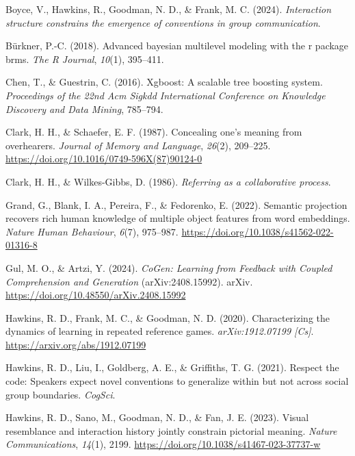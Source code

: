 \documentclass[10pt, letterpaper]{article}
\begin{document}
\label{refs}
\begin{CSLReferences}{1}{0}
Boyce, V., Hawkins, R., Goodman, N. D., \& Frank, M. C. (2024).
\emph{Interaction structure constrains the emergence of conventions in
group communication}.

Bürkner, P.-C. (2018). Advanced bayesian multilevel modeling with the r
package brms. \emph{The R Journal}, \emph{10}(1), 395--411.

Chen, T., \& Guestrin, C. (2016). Xgboost: {A} scalable tree boosting
system. \emph{Proceedings of the 22nd Acm Sigkdd International
Conference on Knowledge Discovery and Data Mining}, 785--794.

Clark, H. H., \& Schaefer, E. F. (1987). Concealing one's meaning from
overhearers. \emph{Journal of Memory and Language}, \emph{26}(2),
209--225. \url{https://doi.org/10.1016/0749-596X(87)90124-0}

Clark, H. H., \& Wilkes-Gibbs, D. (1986). \emph{Referring as a
collaborative process}.

Grand, G., Blank, I. A., Pereira, F., \& Fedorenko, E. (2022). Semantic
projection recovers rich human knowledge of multiple object features
from word embeddings. \emph{Nature Human Behaviour}, \emph{6}(7),
975--987. \url{https://doi.org/10.1038/s41562-022-01316-8}

Gul, M. O., \& Artzi, Y. (2024). \emph{{CoGen}: {Learning} from
{Feedback} with {Coupled Comprehension} and {Generation}}
(arXiv:2408.15992). arXiv.
\url{https://doi.org/10.48550/arXiv.2408.15992}

Hawkins, R. D., Frank, M. C., \& Goodman, N. D. (2020). Characterizing
the dynamics of learning in repeated reference games.
\emph{arXiv:1912.07199 {[}Cs{]}}. \url{https://arxiv.org/abs/1912.07199}

Hawkins, R. D., Liu, I., Goldberg, A. E., \& Griffiths, T. G. (2021).
Respect the code: {Speakers} expect novel conventions to generalize
within but not across social group boundaries. \emph{CogSci}.

Hawkins, R. D., Sano, M., Goodman, N. D., \& Fan, J. E. (2023). Visual
resemblance and interaction history jointly constrain pictorial meaning.
\emph{Nature Communications}, \emph{14}(1), 2199.
\url{https://doi.org/10.1038/s41467-023-37737-w}


\end{CSLReferences}
\end{document}
